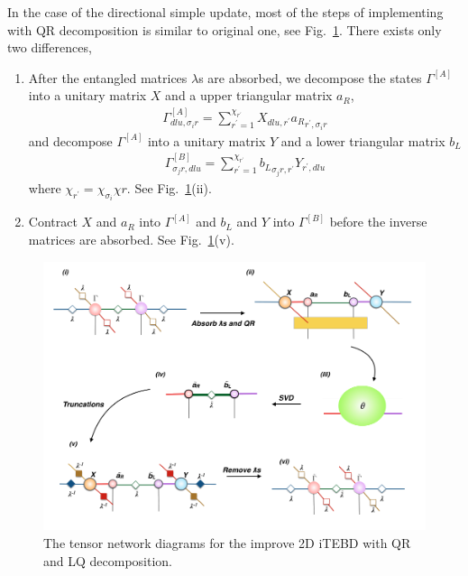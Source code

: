 In the case of the directional simple update, most of the steps of implementing with QR decomposition is similar to original one, see Fig.~\ref{fig319}. There exists only two differences, 
\begin{enumerate}
	\item After the entangled matrices $\lambda$s are absorbed, we decompose the states $\Gamma^{[A]}$ into a unitary matrix $X$ and a upper triangular matrix $a_R$,
		\begin{align}
			\Gamma^{[A]}_{d l u, \sigma_i r} = \sum_{r^{\prime}=1}^{\chi_{r^{\prime}}}X_{d l u, r^{\prime}} {a_R}_{r^{\prime},\sigma_i r}
		\end{align}
		and decompose $\Gamma^{[A]}$ into a unitary matrix $Y$ and a lower triangular matrix $b_L$
		\begin{align}
			\Gamma^{[B]}_{\sigma_j r, d l u} = \sum_{r^{\prime}=1}^{\chi_{r^{\prime}}}{b_L}_{\sigma_j r, r^{\prime}} Y_{r^{\prime}, d l u} 
		\end{align}
		where $\chi_{r^{\prime}} = \chi_{\sigma_i}\chi{r}$. See Fig.~\ref{fig319}(ii).
	\item Contract $X$ and $a_R$ into $\Gamma^{[A]}$ and $b_L$ and $Y$ into $\Gamma^{[B]}$ before the inverse matrices are absorbed. See Fig.~\ref{fig319}(v).

\end{enumerate}
\begin{figure}[H] 
	\centering 
	\includegraphics[width=1.00\textwidth]{figures/fig318.png} 
	\caption[The tensor network diagrams for the improve 2D iTEBD with QR decomposition]{The tensor network diagrams for the improve 2D iTEBD with QR and LQ decomposition.} 
	\label{fig319} 
\end{figure} 


